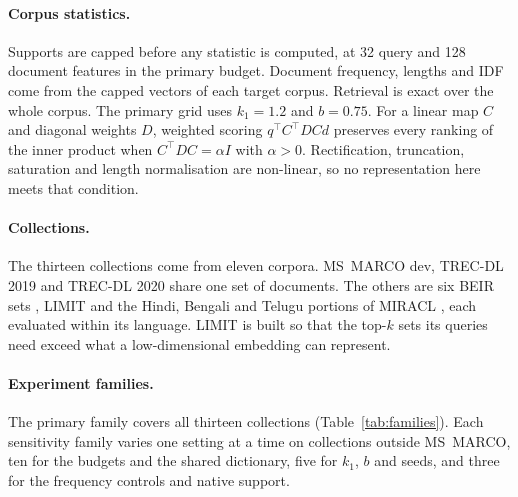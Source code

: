 \documentclass[11pt]{article}
\begin{document}
\paragraph{Corpus statistics.} Supports are capped before any statistic is computed, at
32 query and 128 document features in the primary budget. Document frequency, lengths and
IDF come from the capped vectors of each target corpus. Retrieval is exact over the whole
corpus. The primary grid uses $k_1 = 1.2$ and $b = 0.75$. For a linear map $C$
and diagonal weights $D$, weighted scoring $q^\top C^\top D C d$ preserves every ranking of
the inner product when $C^\top D C = \alpha I$ with $\alpha > 0$. Rectification, truncation, saturation and
length normalisation are non-linear, so no representation here meets that condition.

\paragraph{Collections.} The thirteen collections come from eleven corpora. MS~MARCO dev,
TREC-DL 2019 and TREC-DL 2020 share one set of documents. The others are six BEIR sets
\citep{thakur2021beir}, LIMIT \citep{weller2025limit} and the Hindi, Bengali and Telugu
portions of MIRACL \citep{zhang2023miracl}, each evaluated within its language. LIMIT is
built so that the top-$k$ sets its queries need exceed what a low-dimensional embedding can
represent.

\paragraph{Experiment families.} The primary family covers all thirteen collections
(Table~\ref{tab:families}). Each sensitivity family varies one setting at a time on
collections outside MS~MARCO, ten for the budgets and the shared dictionary, five for
$k_1$, $b$ and seeds, and three for the frequency controls and native support.
\end{document}
